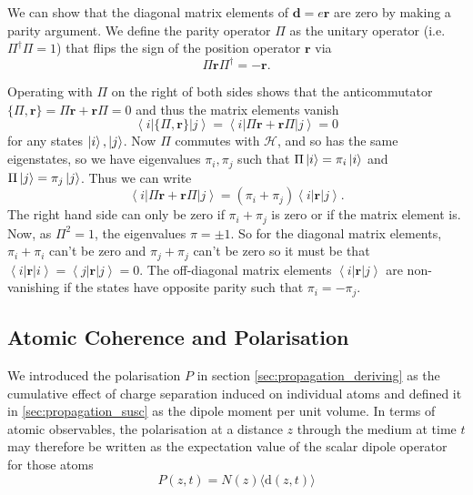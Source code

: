     We can show that the diagonal matrix elements of $\mathbf{d} = e\mathbf{r}$
    are zero by making a parity argument. We define the parity operator $\Pi$ as
    the unitary operator (i.e. $\Pi^\dagger\Pi = 1$) that flips the sign of the
    position operator $\mathbf{r}$ via
    \begin{equation}
      \Pi \mathbf{r} \Pi^\dagger = -\mathbf{r}.
    \end{equation}

    Operating with $\Pi$ on the right of both sides shows that the anticommutator
    $\{ \Pi, \mathbf{r} \} = \Pi \mathbf{r} + \mathbf{r} \Pi = 0$ and thus the
    matrix elements vanish
    \begin{equation}
      \left< i \right| \{ \Pi, \mathbf{r} \} \left| j \right> = 
      \left< i \right| \Pi \mathbf{r} + \mathbf{r} \Pi \left| j \right> = 0 
    \end{equation}
    for any states $\Ket{i}, \Ket{j}$. Now $\Pi$ commutes with $\mathcal{H}$,
    and so has the same eigenstates, so we have eigenvalues $\pi_i, \pi_j$ such
    that $\Pi \Ket{i} = \pi_i \Ket{i}$ and $\Pi \Ket{j} = \pi_j \Ket{j}$. Thus
    we can write
    \begin{equation}
      \left< i \right| \Pi \mathbf{r} + \mathbf{r} \Pi \left| j \right> = 
      (\pi_i + \pi_j) \left< i \right|  \mathbf{r} \left| j \right>.
    \end{equation}
    The right hand side can only be zero if $\pi_i + \pi_j$ is zero or if the
    matrix element is. Now, as $\Pi^2 = 1$, the eigenvalues $\pi = \pm1$. So for
    the diagonal matrix elements, $\pi_i + \pi_i$ can't be zero and $\pi_j +
    \pi_j$ can't be zero so it must be that $\left< i \right|\mathbf{r} \left| i
    \right> = \left< j \right|\mathbf{r} \left| j \right> = 0$. The off-diagonal
    matrix elements $\left< i \right|\mathbf{r} \left| j \right>$ are  non-
    vanishing if the states have opposite parity such that $\pi_i = -\pi_j$.

  \subsection{Atomic Coherence and Polarisation}

    We introduced the polarisation $P$ in section \ref{sec:propagation_deriving}
    as the cumulative effect of charge separation induced on individual atoms
    and defined it in \ref{sec:propagation_susc} as the dipole moment per unit
    volume.  In terms of atomic observables, the polarisation at a distance $z$
    through the medium at time $t$ may therefore be written as the expectation
    value of the scalar dipole operator for those atoms
    \begin{equation}
      P(z,t) = N(z) \langle \mathrm{d}(z,t) \rangle
    \end{equation}

